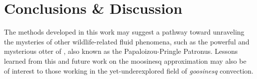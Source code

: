 \section{Conclusions \& Discussion}
\label{sec:conclusions}

The methods developed in this work may suggest a pathway toward
unraveling the mysteries of other wildlife-related fluid phenomena,
such as the powerful and mysterious otter of \cite{Schwab2021}, also
known as the Papaloizou-Pringle Patronus.
Lessons learned from this and future work on the moosinesq approximation may also be of interest to those working in the yet-underexplored field of \textit{goosinesq} convection.
